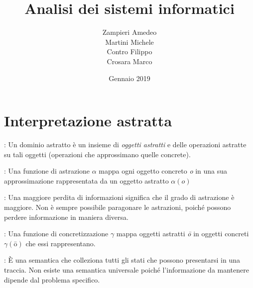 \documentclass[a4paper,12pt,openany]{article}
\title{Analisi dei sistemi informatici}
\author{
  Zampieri Amedeo\\
  Martini Michele\\
  Contro Filippo\\
  Crosara Marco\\
}
\date{Gennaio 2019}
\newenvironment{definition}[1][Definizione]{\begin{trivlist}
\item[\hskip \labelsep {\bfseries #1}]}{\end{trivlist}}
\begin{document}
\maketitle
\newpage

\tableofcontents
\newpage

\section{Interpretazione astratta}

    \begin{definition}[Dominio astratto]: Un dominio astratto è un insieme di \textit{oggetti astratti} e delle operazioni
            astratte su tali oggetti (operazioni che approssimano quelle concrete).
    \end{definition}
    
    \begin{definition}[Astrazione]: Una funzione di astrazione $\alpha$ mappa \textit{}{ogni} oggetto concreto \textit{o}
            in una sua approssimazione rappresentata da un oggetto astratto $\alpha(\textit{o})$
    \end{definition}
    
    \begin{definition}[Comparazione di astrazioni]: Una maggiore perdita di informazioni significa che il grado di
            astrazione è maggiore. Non è sempre possibile paragonare le astrazioni, poiché possono
            perdere informazione in maniera diversa.
    \end{definition}
    
    \begin{definition}[Concretizzazione]: Una funzione di concretizzazione $\gamma$ mappa oggetti astratti \textit{\={o}} in oggetti concreti $\gamma(\textit{\={o}})$ che essi rappresentano.
    \end{definition}
    
    \begin{definition}[Collecting semantics]: È una semantica che colleziona tutti gli stati che possono presentarsi in una traccia. Non esiste una semantica universale poiché l'informazione da mantenere dipende dal problema specifico.
    \end{definition}
    
\end{document}
